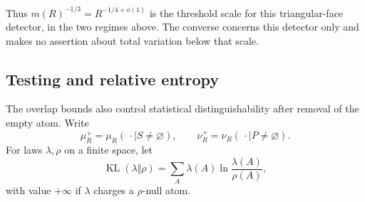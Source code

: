 \documentclass[11pt]{amsart}
\theoremstyle{remark}
\begin{document}
Thus $m(R)^{-1/3}=R^{-1/4+o(1)}$ is the threshold scale for this triangular-face detector, in the two regimes above. The converse concerns this detector only and makes no assertion about total variation below that scale.

\subsection{Testing and relative entropy}\label{sec:testing}

The overlap bounds also control statistical distinguishability after removal of the empty atom. Write
\[
 \mu_R^+=\mu_R(\,\cdot\mid S\ne\varnothing),\qquad
 \nu_R^+=\nu_R(\,\cdot\mid P\ne\varnothing).
\]
For laws $\lambda,\rho$ on a finite space, let
\[
 \operatorname{KL}(\lambda\Vert\rho)
 =\sum_A\lambda(A)\ln\frac{\lambda(A)}{\rho(A)},
\]
with value $+\infty$ if $\lambda$ charges a $\rho$-null atom.
\end{document}
